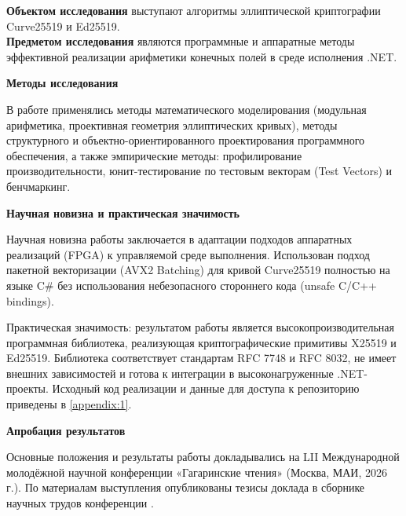 \textbf{Объектом исследования} выступают алгоритмы эллиптической криптографии Curve25519 и Ed25519. \\
\textbf{Предметом исследования} являются программные и аппаратные методы эффективной реализации арифметики конечных полей в среде исполнения .NET.

\textbf{Методы исследования}

В работе применялись методы математического моделирования (модульная арифметика, проективная геометрия эллиптических кривых), методы структурного и объектно-ориентированного проектирования программного обеспечения, а также эмпирические методы: профилирование производительности, юнит-тестирование по тестовым векторам (Test Vectors) и бенчмаркинг.

\textbf{Научная новизна и практическая значимость}

Научная новизна работы заключается в адаптации подходов аппаратных реализаций (FPGA) к управляемой среде выполнения. Использован подход пакетной векторизации (AVX2 Batching) для кривой Curve25519 полностью на языке C\# без использования небезопасного стороннего кода (unsafe C/C++ bindings).

Практическая значимость: результатом работы является высокопроизводительная программная библиотека, реализующая криптографические примитивы X25519 и Ed25519.
 Библиотека соответствует стандартам RFC 7748 и RFC 8032, не имеет внешних зависимостей и готова к интеграции в высоконагруженные .NET-проекты. Исходный код реализации и данные для доступа к репозиторию приведены в \ref{appendix:1}.


\textbf{Апробация результатов}

Основные положения и результаты работы докладывались на LII Международной молодёжной научной конференции «Гагаринские чтения» (Москва, МАИ, 2026 г.). 
По материалам выступления опубликованы тезисы доклада в сборнике научных трудов конференции \cite{Gagarin2026}.